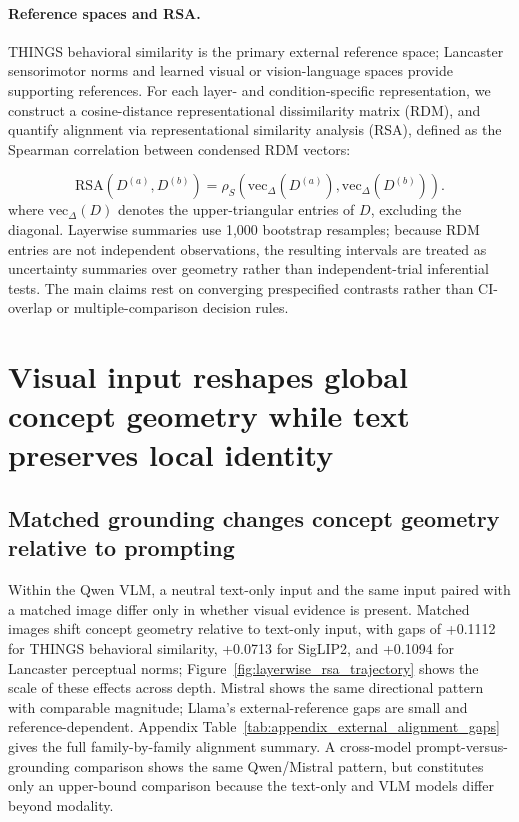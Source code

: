 \documentclass{article}
\begin{document}
\paragraph{Reference spaces and RSA.}
THINGS behavioral similarity is the primary external reference space; Lancaster sensorimotor norms and learned visual or vision-language spaces provide supporting references. For each layer- and condition-specific representation, we construct a cosine-distance representational dissimilarity matrix (RDM), and quantify alignment via representational similarity analysis (RSA), defined as the Spearman correlation between condensed RDM vectors:

\begin{equation}
  \mathrm{RSA}\!\left(D^{(a)}, D^{(b)}\right)
  =
  \rho_S\!\left(
  \mathrm{vec}_{\Delta}(D^{(a)}),
  \mathrm{vec}_{\Delta}(D^{(b)})
  \right).
  \label{eq:rsa}
\end{equation}
where $\mathrm{vec}_{\Delta}(D)$ denotes the upper-triangular entries of $D$, excluding the diagonal. Layerwise summaries use 1,000 bootstrap resamples; because RDM entries are not independent observations, the resulting intervals are treated as uncertainty summaries over geometry rather than independent-trial inferential tests. The main claims rest on converging prespecified contrasts rather than CI-overlap or multiple-comparison decision rules.

\section{Visual input reshapes global concept geometry while text preserves local identity}
\label{sec:global_local}

\subsection{Matched grounding changes concept geometry relative to prompting}
\label{sec:external_alignment}

Within the Qwen VLM, a neutral text-only input and the same input paired with a matched image differ only in whether visual evidence is present. Matched images shift concept geometry relative to text-only input, with gaps of +0.1112 for THINGS behavioral similarity, +0.0713 for SigLIP2, and +0.1094 for Lancaster perceptual norms; Figure~\ref{fig:layerwise_rsa_trajectory} shows the scale of these effects across depth. Mistral shows the same directional pattern with comparable magnitude; Llama's external-reference gaps are small and reference-dependent. Appendix Table~\ref{tab:appendix_external_alignment_gaps} gives the full family-by-family alignment summary. A cross-model prompt-versus-grounding comparison shows the same Qwen/Mistral pattern, but constitutes only an upper-bound comparison because the text-only and VLM models differ beyond modality.
\end{document}

